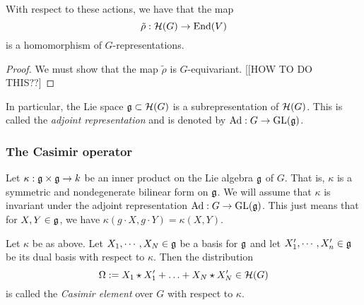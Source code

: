 \documentclass[11pt, english]{article}
\begin{document}
\begin{lemma}
\label{homog}
With respect to these actions, we have that the map
$$
\tilde \rho : \mathcal{H}(G) \to \operatorname{End}(V)
$$
is a homomorphism of $G$-representations.
\end{lemma}
\begin{proof}
We must show that the map $\tilde \rho$ is $G$-equivariant. [[HOW TO DO THIS??]
\end{proof}

In particular, the Lie space $\mathfrak g \subset \mathcal{H}(G)$ is a subrepresentation of $\mathcal{H}(G)$. This is called the \emph{adjoint representation} and is denoted by $\mathrm{Ad}:G \to \operatorname{GL}(\mathfrak g)$.


\subsubsection{The Casimir operator}

Let $\kappa: \mathfrak g \times \mathfrak g \to k$ be an inner product on the Lie algebra $\mathfrak g$ of $G$. That is, $\kappa$ is a symmetric and nondegenerate bilinear form on $\mathfrak g$. We will assume that $\kappa$ is invariant under the adjoint representation $\mathrm{Ad}: G \to \operatorname{GL}(\mathfrak g)$. This just means that for $X,Y \in \mathfrak g$, we have $\kappa(g \cdot X,g \cdot Y)=\kappa(X,Y)$.

\begin{defi}

Let $\kappa$ be as above. Let $X_1,\cdots,X_N \in \mathfrak g$ be a basis for $\mathfrak g$ and let $X_1',\cdots,X_n' \in \mathfrak g$ be its dual basis with respect to $\kappa$. Then the distribution
$$
\Omega := X_1 \star X_1' + \ldots + X_N \star X_N' \in \mathcal{H}(G)
$$
is called the \emph{Casimir element} over $G$ with respect to $\kappa$.
\end{defi}
\end{document}
